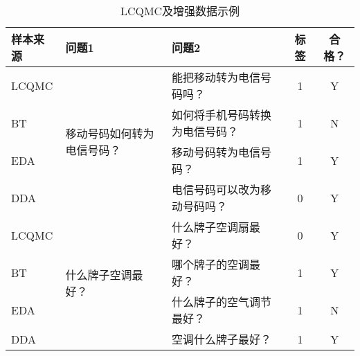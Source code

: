 \begin{table}[h]
    \caption{LCQMC及增强数据示例}
    \centering
    \newcommand{\tabincell}[2]{\begin{tabular}{@{}#1@{}}#2\end{tabular}}
    \begin{tabular}{lllcc}
    \toprule[0.7pt]
    \textbf{样本来源} & \textbf{问题1} & \textbf{问题2}& \textbf{标签}& \textbf{合格？} \\
    \midrule[0.7pt]

    LCQMC & \multirow{4}{*}{移动号码如何转为电信号码？} & 能把移动转为电信号码吗？ & 1 & Y \\
    BT & & 如何将手机号码转换为电信号码？ & 1 & N \\
    EDA &  & 移动号码转为电信号码？ & 1 & Y \\
    DDA &  & 电信号码可以改为移动号码吗？ & 0 & Y \\
    \midrule[0.4pt]
    LCQMC & \multirow{4}{*}{什么牌子空调最好？} & 什么牌子空调扇最好？ & 0 & Y \\
    BT &  & 哪个牌子的空调最好？ & 1 & Y \\
    EDA &  & 什么牌子的空气调节最好？ & 1 & N \\
    DDA &  & 空调什么牌子最好？ & 1 & Y \\


    \bottomrule[0.7pt]
    \end{tabular}
    \label{table4-1}
\end{table}